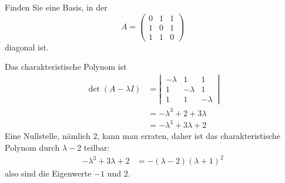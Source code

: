 Finden Sie eine Basis, in der
\[
A=\begin{pmatrix}
0&1&1\\
1&0&1\\
1&1&0
\end{pmatrix}
\]
diagonal ist.


\begin{loesung}
Das charakteristische Polynom ist
\begin{align*}
\det(A-\lambda I)
&=
\left|\,
\begin{matrix}
-\lambda&1&1\\
1&-\lambda&1\\
1&1&-\lambda
\end{matrix}
\,\right|
\\
&=-\lambda^3+2+3\lambda
\\
&=-\lambda^3+3\lambda+2
\end{align*}
Eine Nullstelle, nämlich $2$, kann man erraten, daher ist das
charakteristische Polynom durch $\lambda-2$ teilbar:
\begin{align*}
-\lambda^3+3\lambda+2
&=-(\lambda-2)(\lambda+1)^2
\end{align*}
also sind die Eigenwerte $-1$ und $2$.


\end{loesung}
